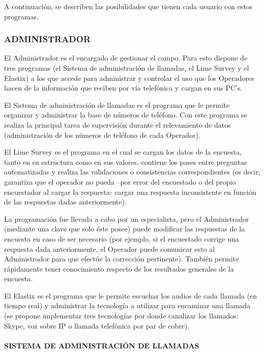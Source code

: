 \documentclass[
  openany]{book}
\begin{document}
A continuación, se describen las posibilidades que tienen cada usuario con estos programas.

\hypertarget{administrador}{%
\subsubsection{\texorpdfstring{\textbf{ADMINISTRADOR}}{ADMINISTRADOR}}\label{administrador}}

El Administrador es el encargado de gestionar el campo. Para esto dispone de tres programas (el Sistema de administración de llamadas, el Lime Survey y el Elastix) a los que accede para administrar y controlar el uso que los Operadores hacen de la información que reciben por vía telefónica y cargan en sus PC's.

El Sistema de administración de llamadas es el programa que le permite organizar y administrar la base de números de teléfono. Con este programa se realiza la principal tarea de supervisión durante el relevamiento de datos (administración de los números de teléfono de cada Operador).

El Lime Survey es el programa en el cual se cargan los datos de la encuesta, tanto en su estructura como en sus valores, contiene los pases entre preguntas automatizadas y realiza las validaciones o consistencias correspondientes (es decir, garantiza que el operador no pueda --por error del encuestado o del propio encuestador al cargar la respuesta- cargar una respuesta inconsistente en función de las respuestas dadas anteriormente).

La programación fue llevada a cabo por un especialista, pero el Administrador (mediante una clave que solo éste posee) puede modificar las respuestas de la encuesta en caso de ser necesario (por ejemplo, si el encuestado corrige una respuesta dada anteriormente, el Operador puede comunicar esto al Administrador para que efectúe la corrección pertinente). También permite rápidamente tener conocimiento respecto de los resultados generales de la encuesta.

El Elastix es el programa que le permite escuchar los audios de cada llamada (en tiempo real) y administrar la tecnología a utilizar para encaminar una llamada (se propone implementar tres tecnologías por donde canalizar los llamados: Skype, voz sobre IP o llamada telefónica por par de cobre).

\hypertarget{sistema-de-administraciuxf3n-de-llamadas}{%
\paragraph{\texorpdfstring{\textbf{SISTEMA DE ADMINISTRACIÓN DE LLAMADAS}}{SISTEMA DE ADMINISTRACIÓN DE LLAMADAS}}\label{sistema-de-administraciuxf3n-de-llamadas}}
\end{document}
